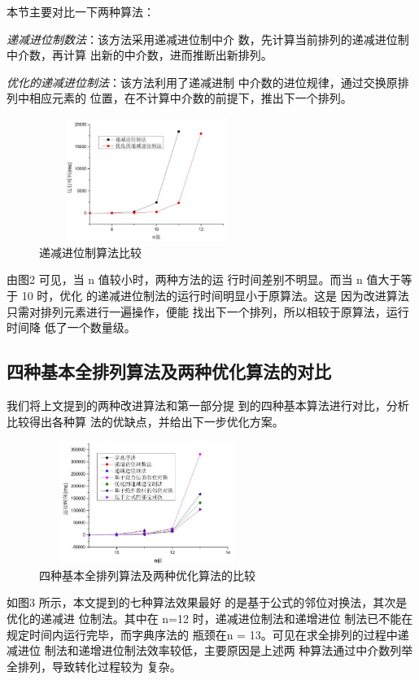 \documentclass[6pt, twocolumn]{ctexart}
\begin{document}
本节主要对比一下两种算法：

\emph{递减进位制数法}：该方法采用递减进位制中介 数，先计算当前排列的递减进位制中介数，再计算 出新的中介数，进而推断出新排列。

\emph{优化的递减进位制法}：该方法利用了递减进制 中介数的进位规律，通过交换原排列中相应元素的 位置，在不计算中介数的前提下，推出下一个排列。
\begin{figure}
\centering	

\caption{递减进位制算法比较}
\includegraphics[width=7cm, height=4cm]{2.png}	
\end{figure}
由图2 可见，当 n 值较小时，两种方法的运 行时间差别不明显。而当 n 值大于等于 10 时，优化 的递减进位制法的运行时间明显小于原算法。这是 因为改进算法只需对排列元素进行一遍操作，便能 找出下一个排列，所以相较于原算法，运行时间降 低了一个数量级。


\subsection{四种基本全排列算法及两种优化算法的对比}
我们将上文提到的两种改进算法和第一部分提 到的四种基本算法进行对比，分析比较得出各种算 法的优缺点，并给出下一步优化方案。

\begin{figure}
\centering	

\caption{四种基本全排列算法及两种优化算法的比较}
\includegraphics[width=7cm, height=4cm]{3.png}	
\end{figure}
如图3 所示，本文提到的七种算法效果最好 的是基于公式的邻位对换法，其次是优化的递减进 位制法。其中在 n=12 时，递减进位制法和递增进位 制法已不能在规定时间内运行完毕，而字典序法的 瓶颈在n = 13。可见在求全排列的过程中递减进位 制法和递增进位制法效率较低，主要原因是上述两 种算法通过中介数列举全排列，导致转化过程较为 复杂。
\end{document}
